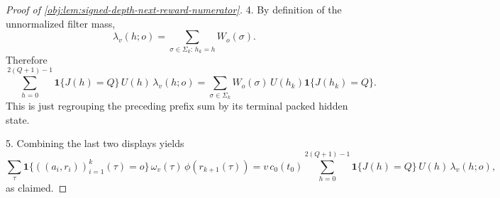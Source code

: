 \begin{proof}[Proof of \cref{obj:lem:signed-depth-next-reward-numerator}]
4.  By definition of the unnormalized filter mass,
\[
\lambda_v(h;o)
=
\sum_{\sigma\in\Sigma_k:\,h_k=h} W_o(\sigma).
\]
Therefore
\[
\sum_{h=0}^{2(Q+1)-1}
\mathbf 1\{J(h)=Q\}\,U(h)\,\lambda_v(h;o)
=
\sum_{\sigma\in\Sigma_k}
W_o(\sigma)\,U(h_k)\mathbf 1\{J(h_k)=Q\}.
\]
This is just regrouping the preceding prefix sum by its terminal packed hidden state. %

5.  Combining the last two displays yields
\[
\sum_{\tau}
\mathbf 1\{((a_i,r_i))_{i=1}^k(\tau)=o\}
\,\omega_v(\tau)\,\phi(r_{k+1}(\tau))
=
v\,c_0(t_0)
\sum_{h=0}^{2(Q+1)-1}
\mathbf 1\{J(h)=Q\}\,U(h)\,\lambda_v(h;o),
\]
as claimed. %
\end{proof}
